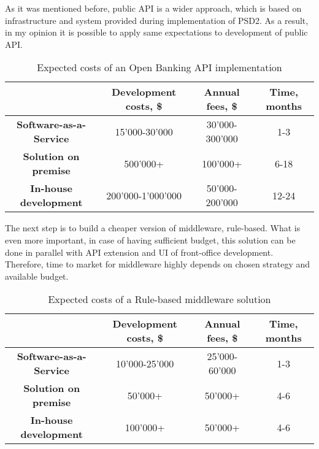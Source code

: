 As it was mentioned before, public API is a wider approach, which is based on infrastructure and system provided during implementation of PSD2.
As a result, in my opinion it is possible to apply same expectations to development of public API.

\begin{table}
    \centering
    \caption{Expected costs of an Open Banking API implementation}
    \begin{tabular}{| c | c | c | c |}
        \hline
        &
        \textbf{Development costs, \$} & 
        \textbf{Annual fees, \$} &
        \textbf{Time, months} \\ \hline 
       
        \textbf{Software-as-a-Service} & 
            15'000-30'000 & 
            30'000-300'000 &
            1-3 \\ \hline 
       
        \textbf{Solution on premise} & 
            500'000+ &
            100'000+ &
            6-18 \\ \hline 
            
        \textbf{In-house development} &
            200'000-1'000'000 &
            50'000-200'000 &
            12-24 \\ \hline
    \end{tabular}
    \medskip
\end{table}

The next step is to build a cheaper version of middleware, rule-based.
What is even more important, in case of having sufficient budget, this solution can be done in parallel with API extension and UI of front-office development.
Therefore, time to market for middleware highly depends on chosen strategy and available budget.

\begin{table}
    \centering
    \caption{Expected costs of a Rule-based middleware solution}
    \begin{tabular}{| c | c | c | c |}
        \hline
        &
        \textbf{Development costs, \$} & 
        \textbf{Annual fees, \$} &
        \textbf{Time, months} \\ \hline 
       
        \textbf{Software-as-a-Service} & 
            10'000-25'000 & 
            25'000-60'000 &
            1-3 \\ \hline 
       
        \textbf{Solution on premise} & 
            50'000+ &
            50'000+ &
            4-6 \\ \hline 
            
        \textbf{In-house development} &
            100'000+ &
            50'000+ &
            4-6 \\ \hline
    \end{tabular}
    \medskip
\end{table}

